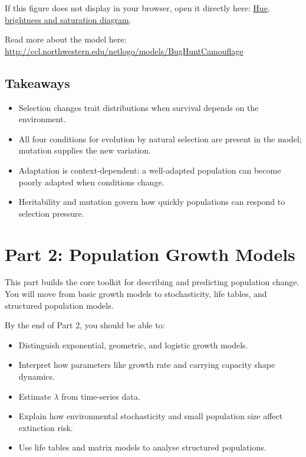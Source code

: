 \documentclass[
  a4paper]{book}
\providecommand{\tightlist}{%
  \setlength{\itemsep}{0pt}\setlength{\parskip}{0pt}}
\begin{document}
If this figure does not display in your browser, open it directly here: \href{images/colours.png}{Hue, brightness and saturation diagram}.

Read more about the model here: \url{http://ccl.northwestern.edu/netlogo/models/BugHuntCamouflage}

\section{Takeaways}\label{takeaways-1}

\begin{itemize}
\tightlist
\item
  Selection changes trait distributions when survival depends on the environment.
\item
  All four conditions for evolution by natural selection are present in the model; mutation supplies the new variation.
\item
  Adaptation is context-dependent: a well-adapted population can become poorly adapted when conditions change.
\item
  Heritability and mutation govern how quickly populations can respond to selection pressure.
\end{itemize}

\chapter*{Part 2: Population Growth Models}\label{part-2}

This part builds the core toolkit for describing and predicting population change. You will move from basic growth models to stochasticity, life tables, and structured population models.

By the end of Part 2, you should be able to:

\begin{itemize}
\tightlist
\item
  Distinguish exponential, geometric, and logistic growth models.
\item
  Interpret how parameters like growth rate and carrying capacity shape dynamics.
\item
  Estimate \(\lambda\) from time-series data.
\item
  Explain how environmental stochasticity and small population size affect extinction risk.
\item
  Use life tables and matrix models to analyse structured populations.
\end{itemize}
\end{document}
